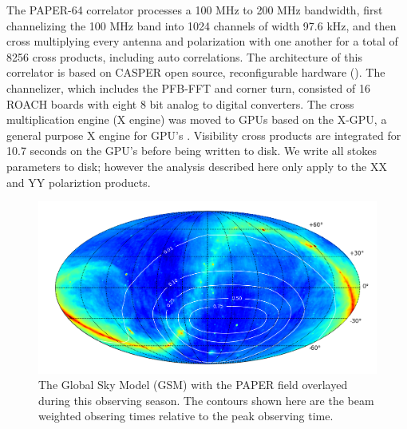 \documentclass[twocolumn,numberedappendix]{emulateapj} \shorttitle{PSA64}
\begin{document}
The PAPER-64 correlator processes a 100 MHz to 200 MHz bandwidth, first
channelizing the 100 MHz band into 1024 channels of width 97.6 kHz, and then
cross multiplying every antenna and polarization with one another for a total of
8256 cross products, including auto correlations. The architecture of this
correlator is based on CASPER open source, reconfigurable hardware
(\cite{parsons_et_al2008}). The channelizer, which includes the PFB-FFT and
corner turn, consisted of 16 ROACH boards with eight 8 bit analog to digital
converters. The cross multiplication engine (X engine) was moved to GPUs based
on the X-GPU, a general purpose X engine for GPU's \citep{clark_et_al2013}. 
Visibility cross products are integrated for 10.7 seconds on the GPU's before
being written to disk. We write all stokes parameters to disk; however the
analysis described here only apply to the XX and YY polariztion products.


\begin{figure}[!t]\centering
\includegraphics[width=2\columnwidth,height=\columnwidth]{plots/coverage.png}
\caption{The Global Sky Model (GSM) with the PAPER field overlayed during this
observing season. The contours shown here are the beam weighted obsering times
relative to the peak observing time.}
\label{fig:coverage}
\end{figure}
\end{document}
